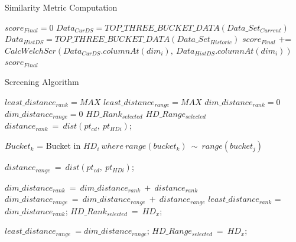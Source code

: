
\begin{algorithm}
\caption{Similarity Metric Computation}
\label{similarity_computation}
\fontsize{10}{15}
\begin{algorithmic}[1]
\State $score_{Final} = 0$
\State $Data_{CurDS} = TOP\_THREE\_BUCKET\_DATA(Data\_Set_{Current})$
\State $Data_{HistDS} = TOP\_THREE\_BUCKET\_DATA(Data\_Set_{Historic})$
	\State $score_{Final}$ += $CalcWelchScr(Data_{CurDS}.columnAt(dim_i),\ Data_{HistDS}.columnAt(dim_i))$
\EndFor
\State\Return $score_{Final}$
\EndProcedure
\end{algorithmic}
\end{algorithm}


 
\begin{algorithm}
\caption{Screening Algorithm}
\label{screening_algo}
\begin{algorithmic}[1]
\State $least\_distance_{rank} = MAX$
\State $least\_distance_{range} = MAX$
\State $dim\_distance_{rank} = 0$
\State $dim\_distance_{range} = 0$
\State $HD\_Rank_{selected}$
\State $HD\_Range_{selected}$
			\State 
				\State $distance_{rank}\ =\  dist(pt_{cd},\ pt_{HDi})$;
			\EndFor

			\State$Bucket_k$ = Bucket in $HD_i\  where\ range(bucket_k)\ \sim \  range(bucket_j)$
			
				\State $distance_{range}\ =\ dist(pt_{cd},\ pt_{HDi})$;  
			\EndFor
		\EndFor
 	 		
		\State $dim\_distance_{rank}\  =\  dim\_distance_{rank} \ + \ distance_{rank}$
		\State $dim\_distance_{range}\  =\  dim\_distance_{range} \ + \ distance_{range}$ 
	\EndFor
 			\State $least\_distance_{rank}$ = $dim\_distance_{rank}$;
			\State $HD\_Rank_{selected}\ = \ HD_x$;
	\EndIf
   	 
   		\State $least\_distance_{range}\ = dim\_distance_{range}$;
   	 	\State $HD\_Range_{selected}\ = \ HD_x$;
	\EndIf
\EndFor
\State{}
\EndProcedure
\end{algorithmic}
\end{algorithm}


